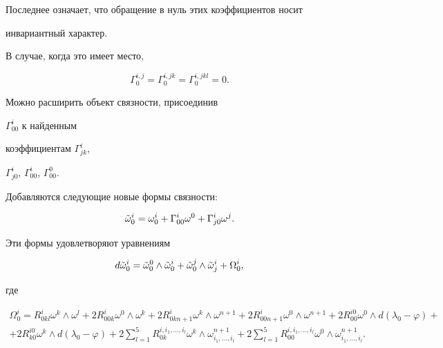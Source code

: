 Последнее означает, что обращение в нуль этих коэффициентов носит 


инвариантный характер. 


В случае, когда это имеет место, 


\begin{equation} 


\Gamma^{i,j}_0=\Gamma^{i,jk}_0= 


\Gamma^{i,jkl}_0=0. 


\end{equation} 


Можно расширить объект связности, присоединив 


$\Gamma^i_{00}$ к найденным 


коэффициентам $\Gamma^i_{jk}$, 


$\Gamma^i_{j0}$, $\Gamma^i_{00}$, $\Gamma^0_{00}$. 


Добавляются следующие новые формы связности: 


\begin{equation} 


\Tilde\omega^i_0=\omega^i_0+\Gamma^i_{00}\omega^0+ 


\Gamma^i_{j0}\omega^j. 


\end{equation} 


Эти формы удовлетворяют уравнениям 


$$ 


d\Tilde\omega^i_0=\Tilde\omega^0_0\wedge\Tilde\omega^i_0+ 


\Tilde\omega^j_0\wedge\Tilde\omega^i_j+\Omega^i_0, 


$$ 


где 


\begin{multline*} 


\Omega^i_0=R^i_{0kl}\omega^k\wedge\omega^l+ 


2R^i_{00k}\omega^0\wedge\omega^k+2R^i_{0kn+1}\omega^k 


\wedge\omega^{n+1}+2R^i_{00n+1}\omega^0\wedge\omega^{n+1}+ 


2R^{i0}_{00}\omega^0\wedge d(\lambda_0-\varphi)+ \\ 


+2R^{i0}_{k0}\omega^k\wedge d(\lambda_0-\varphi)+ 


2\sum^5_{l=1}R^{i,i_1,\dotsc,i_l}_{0k}\omega^k\wedge 


\omega^{n+1}_{i_1,\dotsc,i_l}+ 


2\sum^5_{l=1}R^{i,i_1,\dotsc,i_l}_{00}\omega^0 


\wedge\omega^{n+1}_{i_1,\dotsc,i_l}. 


\end{multline*} 


